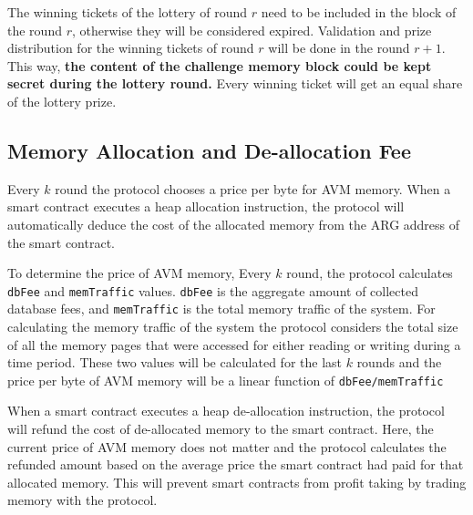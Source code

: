 The winning tickets of the lottery of round $r$ need to be included in the block of the round $r$,
otherwise they will be considered expired. Validation and prize distribution for the winning tickets of round
$r$ will be done in the round $r + 1$. This way, \textbf{the content of the challenge memory block could be
kept secret during the lottery round.} Every winning ticket will get an equal share of the lottery prize.

\subsection{Memory Allocation and De-allocation Fee}\label{subsec:memory-allocation-and-de-allocation}

Every $k$ round the protocol chooses a price per byte for AVM memory. When a smart contract executes a heap
allocation instruction, the protocol will automatically deduce the cost of the allocated memory from the ARG
address of the smart contract.

To determine the price of AVM memory, Every $k$ round, the protocol calculates \texttt{dbFee} and
\texttt{memTraffic} values. \texttt{dbFee} is the aggregate amount of collected database fees, and
\texttt{memTraffic} is the total memory traffic of the system. For calculating the memory traffic of the system
the protocol considers the total size of all the memory pages that were accessed for either reading or writing
during a time period. These two values will be calculated for the last $k$ rounds and the price per byte of
AVM memory will be a linear function of \texttt{dbFee/memTraffic}

When a smart contract executes a heap de-allocation instruction, the protocol will refund the cost of
de-allocated memory to the smart contract. Here, the current price of AVM memory does not matter and the protocol
calculates the refunded amount based on the average price the smart contract had paid for that allocated memory.
This will prevent smart contracts from profit taking by trading memory with the protocol.